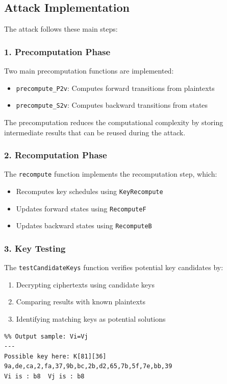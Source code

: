\documentclass{report}
\begin{document}
\subsection{Attack Implementation}
The attack follows these main steps:

\subsubsection{1. Precomputation Phase}
Two main precomputation functions are implemented:
\begin{itemize}
    \item \texttt{precompute\_P2v}: Computes forward transitions from plaintexts
    \item \texttt{precompute\_S2v}: Computes backward transitions from states
\end{itemize}

The precomputation reduces the computational complexity by storing intermediate results that can be reused during the attack.

\subsubsection{2. Recomputation Phase}
The \texttt{recompute} function implements the recomputation step, which:
\begin{itemize}
    \item Recomputes key schedules using \texttt{KeyRecompute}
    \item Updates forward states using \texttt{RecomputeF}
    \item Updates backward states using \texttt{RecomputeB}
\end{itemize}

\subsubsection{3. Key Testing}
The \texttt{testCandidateKeys} function verifies potential key candidates by:
\begin{enumerate}
    \item Decrypting ciphertexts using candidate keys
    \item Comparing results with known plaintexts
    \item Identifying matching keys as potential solutions
\end{enumerate}


\begin{verbatim}
%% Output sample: Vi=Vj
---
Possible key here: K[81][36]
9a,de,ca,2,fa,37,9b,bc,2b,d2,65,7b,5f,7e,bb,39
Vi is : b8	Vj is : b8
\end{verbatim}
\end{document}
